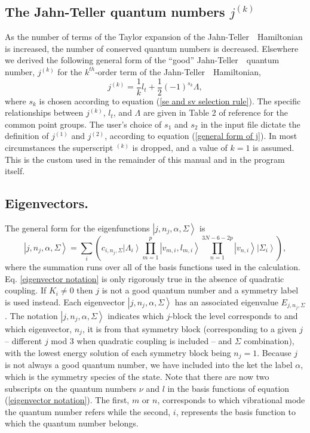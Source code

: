 \documentclass{article}
\newcommand{\JT}{Jahn-Teller\ }
\begin{document}
\subsection{The Jahn-Teller quantum numbers $j^{(k)}$}

As the number of terms of the Taylor expansion of the \JT\ Hamiltonian is increased, the
number of conserved quantum numbers is decreased. Elsewhere\cite{barckholtz}
we derived the following general form of the ``good'' \JT\ quantum
number, $j^{(k)}$ for the $k^{th}$-order term of the \JT\ Hamiltonian,
\begin{equation}
j^{(k)}=\frac{1}{k}l_t+ \frac12 (-1)^{s_k }\Lambda ,
\label{general form of j}
\end{equation}
where $s_k$ is chosen according to equation (\ref{se and sv selection
  rule}). The specific relationships between $j^{(k)}$, $l_t$, and
$\Lambda $ are given in Table 2 of reference  for the
common point groups. The user's choice of $s_1$ and $s_2$ in the input
file dictate the definition of $j^{(1)}$ and $j^{(2)}$, according to
equation (\ref{general form of j}). 
In most circumstances the superscript $^{(k)}$ is
dropped, and a value of $k=1$ is assumed. This is the custom used in
the remainder of this manual and in the program itself.

\subsection{Eigenvectors.} The general form for the eigenfunctions 
$\left| j,n_{j},\alpha ,\Sigma \right\rangle $ is 
\begin{equation}
\left| j,n_{j},\alpha ,\Sigma \right\rangle =\sum_{i}\left( c_{i,n_{j},\Sigma }\left|
\Lambda _{i}\right\rangle 
\prod\limits_{m=1}^{p}\left| v_{m,i},l_{m,i}\right\rangle
\prod\limits_{n=1}^{3N - 6 - 2p}\left| v_{n,i}\right\rangle
 \left| \Sigma _i \right\rangle 
\right), \label{eigenvector notation}
\end{equation}
where the summation runs over all of the basis functions used in the
calculation. Eq. \ref{eigenvector notation} is only rigorously true in the absence of quadratic coupling. If $K_i\neq0$ then $j$ is not a good quantum number and a symmetry label is used instead. Each eigenvector $\left| j,n_{j},\alpha ,\Sigma \right\rangle $
has an associated eigenvalue $E_{j,n_{j},\Sigma }$. The notation $\left|
j,n_{j},\alpha ,\Sigma \right\rangle $ indicates which $j$-block the level
corresponds to and which eigenvector, $n_{j}$, it is from that symmetry
block (corresponding to a given $j$ -- different $j$ mod 3 when
quadratic coupling is included -- and $\Sigma$ combination), with the
lowest energy solution of each symmetry block being $n_{j}=1$.  
Because $j$
is not always a good quantum number, we have included into the ket the label 
$\alpha $, which is the symmetry species 
of the state. Note that there are now two subscripts on the quantum numbers $\nu $ and $l$
in the basis functions of equation (\ref{eigenvector notation}). 
The first, $m$ or $n$, corresponds to which vibrational
mode the quantum number refers while the second, $i$, represents the basis
function to which the quantum number belongs. 
\end{document}
